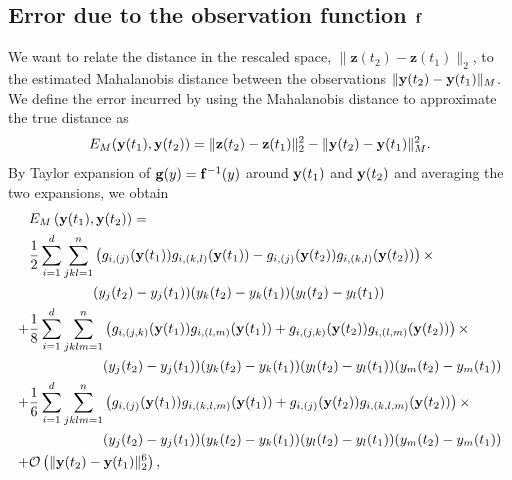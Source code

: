 \subsection{Error due to the observation function $\mathbf{f}$}

We want to relate the distance in the rescaled space, $\|\mathbf{z}(t_2) - \mathbf{z}(t_1)\|_2$, to the estimated Mahalanobis distance between the observations $\| \mathbf{y}(t_2) - \mathbf{y}(t_1)\|_M$.
%
We define the error incurred by using the Mahalanobis distance to approximate the true distance as
\begin{equation}
E_M(\mathbf{y}(t_1), \mathbf{y}(t_2)) = \|\mathbf{z}(t_2) - \mathbf{z}(t_1)\|_2^2 - \| \mathbf{y}(t_2) - \mathbf{y}(t_1)\|^2_M .
\end{equation}
%
By Taylor expansion of $\mathbf{g}(y) = \mathbf{f}^{-1}(y)$ around $\mathbf{y}(t_1)$ and $\mathbf{y}(t_2)$ and averaging the two expansions, we obtain
%
\begin{equation} \label{eq:mahanaobis_error}
\begin{aligned}
& E_M\left( \mathbf{y}(t_1), \mathbf{y}(t_2) \right)
 = \\
& \begin{aligned}[t]
 \frac{1}{2} \sum_{i=1}^d \sum_{jkl=1}^{n} &
\left( g_{i, (j)} (\mathbf{y}(t_1)) g_{i, (k,l)} (\mathbf{y}(t_1)) -  g_{i, (j)} (\mathbf{y}(t_2)) g_{i, (k,l)} (\mathbf{y}(t_2)) \right) \times \\
& ({y}_j(t_2) - {y}_j(t_1)) ({y}_k(t_2) - {y}_k(t_1))({y}_l(t_2) - {y}_l(t_1))
\end{aligned} \\
+&
\begin{aligned}[t]
\frac{1}{8} \sum_{i=1}^d \sum_{jklm=1}^n  &
\left( g_{i, (j,k)} (\mathbf{y}(t_1)) g_{i, (l,m)} (\mathbf{y}(t_1)) +  g_{i, (j,k)} (\mathbf{y}(t_2)) g_{i, (l,m)} (\mathbf{y}(t_2)) \right) \times
 \\
&({y}_j(t_2) - {y}_j(t_1))  ({y}_k(t_2) - {y}_k(t_1))({y}_l(t_2) - {y}_l(t_1)) ({y}_m(t_2) - {y}_m(t_1))
\end{aligned} \\
+&
\begin{aligned} [t]
\frac{1}{6} \sum_{i=1}^d \sum_{jklm=1}^n &
\left( g_{i, (j)} (\mathbf{y}(t_1)) g_{i, (k,l,m)} (\mathbf{y}(t_1)) +  g_{i, (j)} (\mathbf{y}(t_2)) g_{i, (k,l,m)} (\mathbf{y}(t_2)) \right) \times \\
& ({y}_j(t_2) - {y}_j(t_1))  ({y}_k(t_2) - {y}_k(t_1))({y}_l(t_2) - {y}_l(t_1))({y}_m(t_2) - {y}_m(t_1))
\end{aligned} \\
+& \mathcal{O} \left(\| \mathbf{y}(t_2) - \mathbf{y}(t_1) \|^6_2 \right) ,
\end{aligned}
\end{equation}
